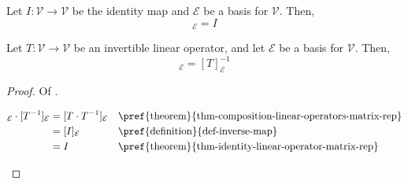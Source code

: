 \begin{thm}\label{thm-identity-linear-operator-matrix-rep}
	Let $I:\mathcal{V}\to\mathcal{V}$ be the identity map and $\mathcal{E}$ be a
	basis for $\mathcal{V}$. Then,
	\begin{equation}
		[I]_\mathcal{E} = I
	\end{equation}
\end{thm}

\begin{thm}\label{thm-inverse-linear-operator-matrix-rep}
	Let $T:\mathcal{V}\to\mathcal{V}$ be an invertible linear operator, and let
	$\mathcal{E}$ be a basis for $\mathcal{V}$. Then,
	\begin{equation}
		[T^{-1}]_\mathcal{E}=[T]_\mathcal{E}^{-1}
	\end{equation}
\end{thm}

\begin{proof}
	Of .
	\begin{flushleft}
		\begin{align*}
			[T]_\mathcal{E} \cdot  [T^{-1}]_\mathcal{E}
			 & = [T \cdot T^{-1}]_\mathcal{E} &  & \text{\pref{theorem}{thm-composition-linear-operators-matrix-rep}} \\
			 & = [I]_\mathcal{E}              &  & \text{\pref{definition}{def-inverse-map}}                          \\
			 & = I                            &  & \text{\pref{theorem}{thm-identity-linear-operator-matrix-rep}}
		\end{align*}
	\end{flushleft}
\end{proof}
